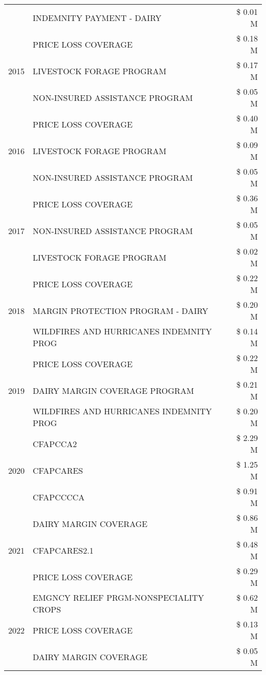 \begin{tabular}{llr}
 & INDEMNITY PAYMENT - DAIRY & \$ 0.01 M \\
\cline{1-3}
\multirow[t]{3}{*}{2015} & PRICE LOSS COVERAGE & \$ 0.18 M \\
 & LIVESTOCK FORAGE PROGRAM & \$ 0.17 M \\
 & NON-INSURED ASSISTANCE PROGRAM & \$ 0.05 M \\
\cline{1-3}
\multirow[t]{3}{*}{2016} & PRICE LOSS COVERAGE & \$ 0.40 M \\
 & LIVESTOCK FORAGE PROGRAM & \$ 0.09 M \\
 & NON-INSURED ASSISTANCE PROGRAM & \$ 0.05 M \\
\cline{1-3}
\multirow[t]{3}{*}{2017} & PRICE LOSS COVERAGE & \$ 0.36 M \\
 & NON-INSURED ASSISTANCE PROGRAM & \$ 0.05 M \\
 & LIVESTOCK FORAGE PROGRAM & \$ 0.02 M \\
\cline{1-3}
\multirow[t]{3}{*}{2018} & PRICE LOSS COVERAGE & \$ 0.22 M \\
 & MARGIN PROTECTION PROGRAM - DAIRY & \$ 0.20 M \\
 & WILDFIRES AND HURRICANES INDEMNITY PROG & \$ 0.14 M \\
\cline{1-3}
\multirow[t]{3}{*}{2019} & PRICE LOSS COVERAGE & \$ 0.22 M \\
 & DAIRY MARGIN COVERAGE PROGRAM & \$ 0.21 M \\
 & WILDFIRES AND HURRICANES INDEMNITY PROG & \$ 0.20 M \\
\cline{1-3}
\multirow[t]{3}{*}{2020} & CFAPCCA2 & \$ 2.29 M \\
 & CFAPCARES & \$ 1.25 M \\
 & CFAPCCCCA & \$ 0.91 M \\
\cline{1-3}
\multirow[t]{3}{*}{2021} & DAIRY MARGIN COVERAGE & \$ 0.86 M \\
 & CFAPCARES2.1 & \$ 0.48 M \\
 & PRICE LOSS COVERAGE & \$ 0.29 M \\
\cline{1-3}
\multirow[t]{3}{*}{2022} & EMGNCY RELIEF PRGM-NONSPECIALITY CROPS & \$ 0.62 M \\
 & PRICE LOSS COVERAGE & \$ 0.13 M \\
 & DAIRY MARGIN COVERAGE & \$ 0.05 M \\
\cline{1-3}
\bottomrule
\end{tabular}
